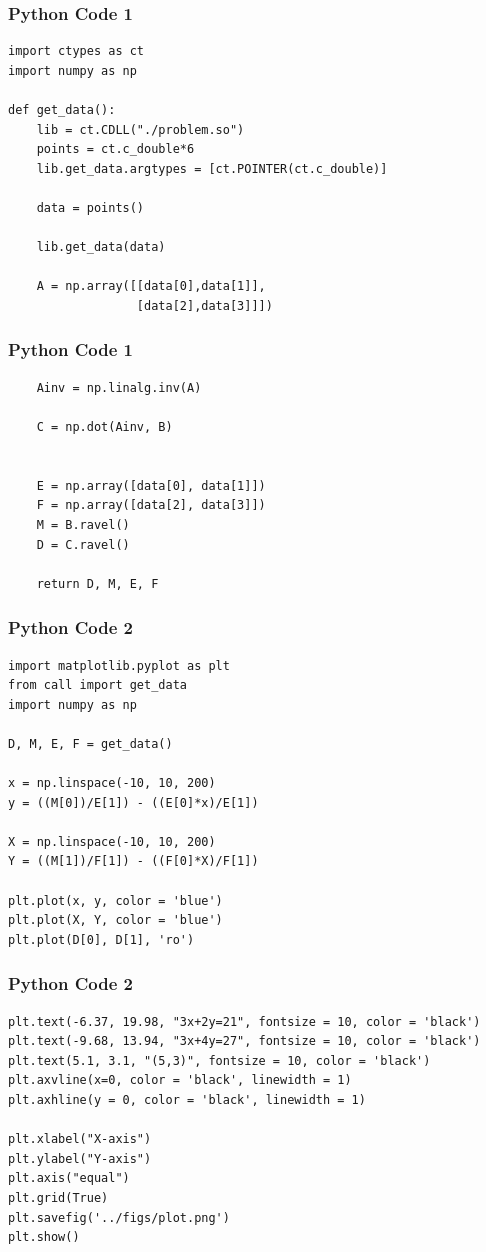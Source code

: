 \documentclass{beamer}
\begin{document}
\begin{frame}[fragile]
    \frametitle{Python Code 1}
    \begin{lstlisting}
import ctypes as ct
import numpy as np

def get_data():
    lib = ct.CDLL("./problem.so")
    points = ct.c_double*6
    lib.get_data.argtypes = [ct.POINTER(ct.c_double)]

    data = points()

    lib.get_data(data)

    A = np.array([[data[0],data[1]],
                  [data[2],data[3]]])
    \end{lstlisting}
\end{frame}

\begin{frame}[fragile]
    \frametitle{Python Code 1}
    \begin{lstlisting}
    Ainv = np.linalg.inv(A)

    C = np.dot(Ainv, B)

    
    E = np.array([data[0], data[1]])
    F = np.array([data[2], data[3]])
    M = B.ravel()
    D = C.ravel()
    
    return D, M, E, F
    \end{lstlisting}
\end{frame}

\begin{frame}[fragile]
    \frametitle{Python Code 2}
    \begin{lstlisting}
import matplotlib.pyplot as plt
from call import get_data
import numpy as np

D, M, E, F = get_data()

x = np.linspace(-10, 10, 200)
y = ((M[0])/E[1]) - ((E[0]*x)/E[1])

X = np.linspace(-10, 10, 200)
Y = ((M[1])/F[1]) - ((F[0]*X)/F[1])

plt.plot(x, y, color = 'blue')
plt.plot(X, Y, color = 'blue')
plt.plot(D[0], D[1], 'ro')
    \end{lstlisting}
\end{frame}

\begin{frame}[fragile]
    \frametitle{Python Code 2}
    \begin{lstlisting}
plt.text(-6.37, 19.98, "3x+2y=21", fontsize = 10, color = 'black')
plt.text(-9.68, 13.94, "3x+4y=27", fontsize = 10, color = 'black')
plt.text(5.1, 3.1, "(5,3)", fontsize = 10, color = 'black')
plt.axvline(x=0, color = 'black', linewidth = 1)
plt.axhline(y = 0, color = 'black', linewidth = 1)

plt.xlabel("X-axis")
plt.ylabel("Y-axis")
plt.axis("equal")
plt.grid(True)
plt.savefig('../figs/plot.png')
plt.show()   \end{lstlisting}
\end{frame}
\end{document}
